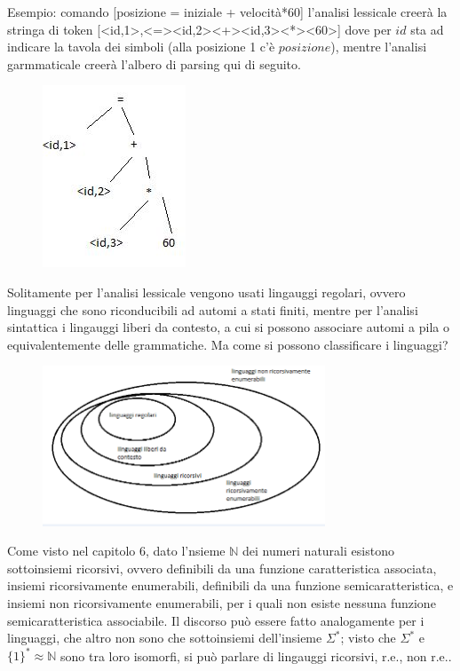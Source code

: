 Esempio: comando
[posizione = iniziale + velocità*60]
l'analisi lessicale creerà la stringa di token
[<id,1>,<=><id,2><+><id,3><*><60>]
dove per $id$ sta ad indicare la tavola dei simboli (alla posizione 1 c'è $posizione$), mentre l'analisi garmmaticale
creerà l'albero di parsing qui di seguito.
\begin{figure}[h]
	\includegraphics{img/Capture.JPG}
	\label{fig:Capture}
\end{figure}

Solitamente per l'analisi lessicale vengono usati lingauggi regolari, ovvero linguaggi che sono riconducibili ad automi
a stati finiti, mentre per l'analisi sintattica i lingauggi liberi da contesto, a cui si possono associare automi a pila o equivalentemente delle grammatiche. Ma come si possono classificare i linguaggi?
\begin{figure}[h]
	\includegraphics[width=0.75\textwidth]{img/liguaggi.png}
	\label{fig:liguaggi}
\end{figure}

Come visto nel capitolo 6, dato l'nsieme $\mathbb{N}$ dei numeri naturali esistono sottoinsiemi ricorsivi, ovvero
definibili da una funzione caratteristica associata,  insiemi ricorsivamente enumerabili, definibili da una funzione
semicaratteristica, e insiemi non ricorsivamente enumerabili, per i quali non esiste nessuna funzione semicaratteristica associabile. Il discorso può essere fatto analogamente per i linguaggi, che altro non sono che sottoinsiemi
dell'insieme $\Sigma^*$; visto che $\Sigma^*$ e $\{1\}^*\approx\mathbb{N}$  sono tra loro isomorfi, si può
parlare di lingauggi ricorsivi, r.e., non r.e..

